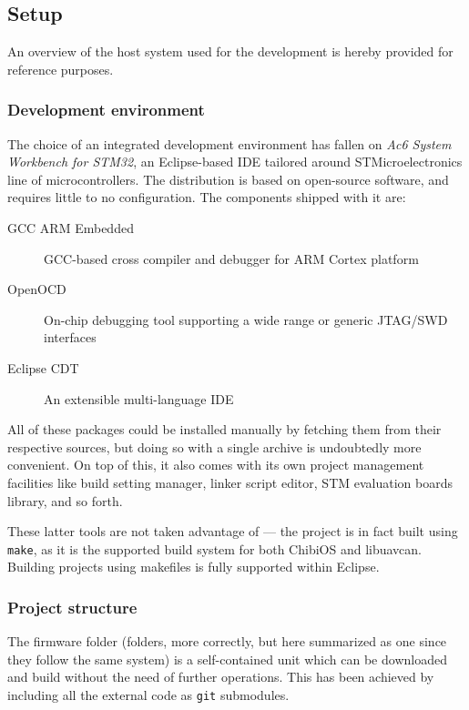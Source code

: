 \subsection{Setup}\label{subsec:sw_setup}
An overview of the host system used for the development is hereby provided for reference purposes.

\subsubsection{Development environment}
The choice of an integrated development environment has fallen on \emph{Ac6 System Workbench for STM32}, an Eclipse-based IDE tailored around STMicroelectronics line of microcontrollers.
The distribution is based on open-source software, and requires little to no configuration.
The components shipped with it are:
\begin{description}
    \item[GCC ARM Embedded] GCC-based cross compiler and debugger for ARM Cortex platform
    \item[OpenOCD] On-chip debugging tool supporting a wide range or generic JTAG/SWD interfaces
    \item[Eclipse CDT] An extensible multi-language IDE
\end{description}
All of these packages could be installed manually by fetching them from their respective sources, but doing so with a single archive is undoubtedly more convenient.
On top of this, it also comes with its own project management facilities like build setting manager, linker script editor, STM evaluation boards library, and so forth.

These latter tools are not taken advantage of --- the project is in fact built using \texttt{make}, as it is the supported build system for both ChibiOS and libuavcan.
Building projects using makefiles is fully supported within Eclipse.




\subsubsection{Project structure}
The firmware folder (folders, more correctly, but here summarized as one since they follow the same system) is a self-contained unit which can be downloaded and build without the need of further operations.
This has been achieved by including all the external code as \texttt{git} submodules.

